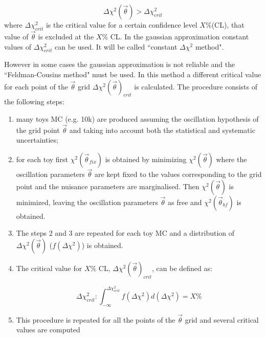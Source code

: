 \begin{equation} \label{eq:condition_cl}
\Delta \chi^2(\vec{\theta}) > \Delta \chi^2_{crit}
\end{equation}
where $\Delta \chi^2_{crit}$ 
is the critical value for a certain confidence level $X\%$(CL),
that value of $\vec{\theta}$ is excluded at the $X\%$ CL.
In the gaussian approximation constant values of $\Delta \chi^2_{crit}$ can be used.
It will be called ``constant $\Delta \chi^2$ method".

However in some cases the gaussian approximation is not reliable
and the ``Feldman-Cousins method" \cite{FeldmanCousins} must be used.
In this method a different critical value for each point of the $\vec{\theta}$ grid 
$\Delta \chi^2 (\vec{\theta})_{crit}$
is calculated.
The procedure consists of the following steps:

\begin{enumerate}

\item many toys MC (e.g. 10k) are produced 
	assuming the oscillation hypothesis of the grid point $\vec{\theta}$
 	and taking into account both the statistical and systematic uncertainties; 

\item for each toy first $\chi^2(\vec{\theta}_{fix})$ is obtained
	by minimizing $\chi^2 (\vec{\theta})$
	where the oscillation parameters $\vec{\theta}$ are kept 
	fixed to the values corresponding to the grid point  
	and the nuisance parameters are marginalised.
	Then $\chi^2 (\vec{\theta})$ is minimized, 
	leaving the oscillation parameters $\vec{\theta}$ as free and
	$\chi^2 (\vec{\theta}_{bf})$ is obtained. 
	

\item The steps 2 and 3 are repeated for each toy MC 
	and a distribution of $\Delta \chi^2 (\vec{\theta})$ ($f(\Delta \chi^2)$)
	is obtained.

\item The critical value for $X\%$ CL,
 	$\Delta \chi^2 (\vec{\theta})_{crit}$,
	can be defined as:
	
	\begin{equation} \label{eq:def_crit_val}
	\Delta \chi^2_{crit}: \int_{-\infty}^{\Delta \chi^2_{crit}} f(\Delta \chi^2) d( \Delta \chi^2) = X\%
	\end{equation}		
\item This procedure is repeated for all the points of the $\vec{\theta}$ grid
	and several critical values are computed
	
\end{enumerate}

